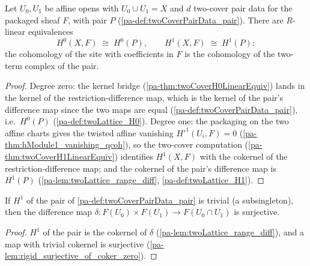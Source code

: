 \begin{definition}
  \label{pa-def:twoCoverPair_h0h1}
  \leanok

  Let \(U_0, U_1\) be affine opens with \(U_0 \cup U_1 = X\) and \(d\) two-cover pair
  data for the packaged sheaf \(F\), with pair \(P\)
  (\ref{pa-def:twoCoverPairData_pair}). There are \(R\)-linear equivalences
  \[
    H^0(X, F) \;\cong\; H^0(P), \qquad H^1(X, F) \;\cong\; H^1(P) :
  \]
  the cohomology of the site with coefficients in \(F\) is the cohomology of the
  two-term complex of the pair.
\end{definition}
\begin{proof}
  \leanok
  Degree zero: the kernel bridge (\ref{pa-thm:twoCoverH0LinearEquiv}) lands in the kernel
  of the restriction-difference map, which is the kernel of the pair's difference map
  since the two maps are equal (\ref{pa-def:twoCoverPairData_pair}), i.e.\ \(H^0(P)\)
  (\ref{pa-def:twoLattice_H0}). Degree one: the packaging on the two affine charts gives
  the twisted affine vanishing \(H'^1(U_i, F) = 0\)
  (\ref{pa-thm:hModule1_vanishing_qcoh}), so the two-cover computation
  (\ref{pa-thm:twoCoverH1LinearEquiv}) identifies \(H^1(X, F)\) with the cokernel of the
  restriction-difference map; and the cokernel of the pair's difference map is
  \(H^1(P)\) (\ref{pa-lem:twoLattice_range_diff}, \ref{pa-def:twoLattice_H1}).
\end{proof}

\begin{lemma}
  \label{pa-lem:twoCoverPair_surjective_diff}
  \leanok

  If \(H^1\) of the pair of \ref{pa-def:twoCoverPairData_pair} is trivial (a
  subsingleton), then the difference map \(\delta : F(U_0) \times F(U_1) \to
  F(U_0 \cap U_1)\) is surjective.
\end{lemma}
\begin{proof}
  \leanok
  \(H^1\) of the pair is the cokernel of \(\delta\) (\ref{pa-lem:twoLattice_range_diff}),
  and a map with trivial cokernel is surjective
  (\ref{pa-lem:rigid_surjective_of_coker_zero}).
\end{proof}

